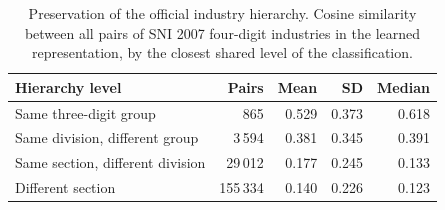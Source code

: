 \begin{table}[htbp]
\centering
\small
\caption{Preservation of the official industry hierarchy. Cosine similarity between all pairs of SNI 2007 four-digit industries in the learned representation, by the closest shared level of the classification.}
\label{tab:hierarchy}
\begin{tabular}{lrrrr}
\toprule
Hierarchy level & Pairs & Mean & SD & Median \\
\midrule
Same three-digit group & 865 & 0.529 & 0.373 & 0.618 \\
Same division, different group & 3\,594 & 0.381 & 0.345 & 0.391 \\
Same section, different division & 29\,012 & 0.177 & 0.245 & 0.133 \\
Different section & 155\,334 & 0.140 & 0.226 & 0.123 \\
\bottomrule
\end{tabular}
\end{table}
